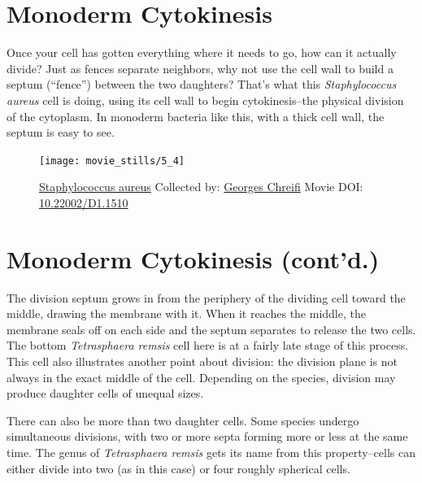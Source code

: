 \documentclass[]{tufte-book}
\begin{document}
\section{Monoderm Cytokinesis}\label{monoderm-cytokinesis}

Once your cell has gotten everything where it needs to go, how can it
actually divide? Just as fences separate neighbors, why not use the cell
wall to build a septum (``fence'') between the two daughters? That's
what this \emph{Staphylococcus aureus} cell is doing, using its cell
wall to begin cytokinesis--the physical division of the cytoplasm. In
monoderm bacteria like this, with a thick cell wall, the septum is easy
to see.





\begin{figure}
\texttt{[image: movie\_stills/5\_4]} \caption[\protect\hyperlink{tree}{Staphylococcus aureus} Collected by:
\protect\hyperlink{georges_chreifi}{Georges Chreifi} Movie DOI:
\href{https://doi.org/10.22002/D1.1510}{10.22002/D1.1510}]{\protect\hyperlink{tree}{Staphylococcus aureus} Collected by:
\protect\hyperlink{georges_chreifi}{Georges Chreifi} Movie DOI:
\href{https://doi.org/10.22002/D1.1510}{10.22002/D1.1510}}\label{fig:5-4}
\end{figure}

\section{Monoderm Cytokinesis
(cont'd.)}\label{monoderm-cytokinesis-contd.}

The division septum grows in from the periphery of the dividing cell
toward the middle, drawing the membrane with it. When it reaches the
middle, the membrane seals off on each side and the septum separates to
release the two cells. The bottom \emph{Tetrasphaera remsis} cell here
is at a fairly late stage of this process. This cell also illustrates
another point about division: the division plane is not always in the
exact middle of the cell. Depending on the species, division may produce
daughter cells of unequal sizes.

There can also be more than two daughter cells. Some species undergo
simultaneous divisions, with two or more septa forming more or less at
the same time. The genus of \emph{Tetrasphaera remsis} gets its name
from this property--cells can either divide into two (as in this case)
or four roughly spherical cells.
\end{document}
